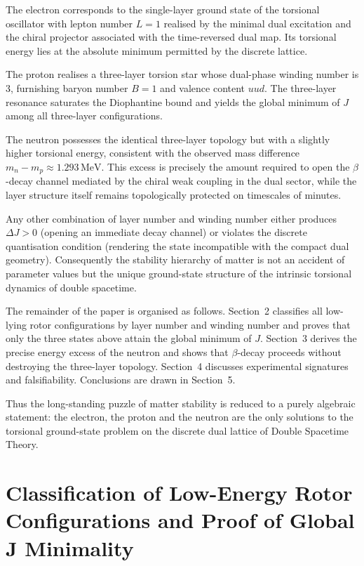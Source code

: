 \documentclass[a4paper]{article}
\begin{document}
The electron corresponds to the single-layer ground state of the torsional oscillator with lepton number \(L=1\) realised by the minimal dual excitation and the chiral projector associated with the time-reversed dual map. Its torsional energy lies at the absolute minimum permitted by the discrete lattice.

The proton realises a three-layer torsion star whose dual-phase winding number is 3, furnishing baryon number \(B=1\) and valence content \(uud\). The three-layer resonance saturates the Diophantine bound and yields the global minimum of \(J\) among all three-layer configurations.

The neutron possesses the identical three-layer topology but with a slightly higher torsional energy, consistent with the observed mass difference \(m_n-m_p\approx1.293\,\mathrm{MeV}\). This excess is precisely the amount required to open the \(\beta\)-decay channel mediated by the chiral weak coupling in the dual sector, while the layer structure itself remains topologically protected on timescales of minutes.

Any other combination of layer number and winding number either produces \(\Delta J>0\) (opening an immediate decay channel) or violates the discrete quantisation condition (rendering the state incompatible with the compact dual geometry). Consequently the stability hierarchy of matter is not an accident of parameter values but the unique ground-state structure of the intrinsic torsional dynamics of double spacetime.

The remainder of the paper is organised as follows. Section~2 classifies all low-lying rotor configurations by layer number and winding number and proves that only the three states above attain the global minimum of \(J\). Section~3 derives the precise energy excess of the neutron and shows that \(\beta\)-decay proceeds without destroying the three-layer topology. Section~4 discusses experimental signatures and falsifiability. Conclusions are drawn in Section~5.

Thus the long-standing puzzle of matter stability is reduced to a purely algebraic statement: the electron, the proton and the neutron are the only solutions to the torsional ground-state problem on the discrete dual lattice of Double Spacetime Theory.

\section{Classification of Low-Energy Rotor Configurations and Proof of Global J Minimality}
\end{document}
